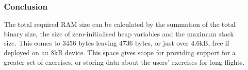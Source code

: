 \subsubsection{Conclusion}

The total required RAM size can be calculated by the summation of the total binary size, the size of zero-initialised heap variables and the maximum stack size. This comes to 3456 bytes leaving 4736 bytes, or just over 4.6kB, free if deployed on an 8kB device. This space gives scope for providing support for a greater set of exercises, or storing data about the users' exercises for long flights.
